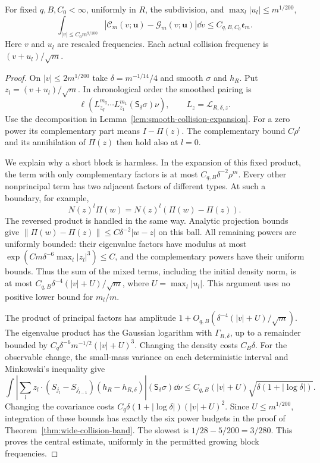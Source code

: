 \begin{theorem}
\label{thm:multiblock-collision-band}
For fixed $q,B,C_0<\infty$, uniformly in $R$, the subdivision, and
$\max_l|u_l|\le m^{1/200}$,
\begin{equation}\label{eq:multiblock-collision-band}
 \int_{|v|\le C_0m^{9/100}}
   |\mathcal C_m(v;\mathbf u)-\mathcal G_m(v;\mathbf u)|\dd v
          \le C_{q,B,C_0}\mathfrak e_m.
\end{equation}
Here $v$ and $u_l$ are rescaled frequencies. Each actual collision
frequency is $(v+u_l)/\sqrt m$.
\end{theorem}
\begin{proof}
On $|v|\le2m^{1/200}$ take $\delta=m^{-1/14}/4$ and smooth
$\sigma$ and $h_R$. Put $z_l=(v+u_l)/\sqrt m$. In chronological
order the smoothed pairing is
\[
 \ell\left(L_{z_q}^{m_q}\cdots L_{z_1}^{m_1}
                         (\mathsf S_\delta\sigma)\nu\right),
 \qquad L_z=\mathcal L_{R,\delta,z}.
\]
Use the decomposition in Lemma~\ref{lem:smooth-collision-expansion}.
For a zero power its complementary part means $I-\Pi(z)$.
The complementary bound $C\rho^l$ and its annihilation of $\Pi(z)$
then hold also at $l=0$.

We explain why a short block is harmless. In the expansion of this
fixed product, the term with only complementary factors is at most
$C_{q,B}\delta^{-2}\rho^m$. Every other nonprincipal term has two
adjacent factors of different types. At such a boundary, for example,
\[
 N(z)^{l}\Pi(w)=N(z)^{l}(\Pi(w)-\Pi(z)).
\]
The reversed product is handled in the same way. Analytic projection
bounds give $\|\Pi(w)-\Pi(z)\|\le C\delta^{-2}|w-z|$ on this
ball. All remaining powers are uniformly bounded: their eigenvalue
factors have modulus at most
$\exp(Cm\delta^{-6}\max_l|z_l|^3)\le C$, and the complementary
powers have their uniform bounds. Thus the sum of the mixed terms,
including the initial density norm, is at most
$C_{q,B}\delta^{-4}(|v|+U)/\sqrt m$, where $U=\max_l|u_l|$.
This argument uses no positive lower bound for $m_l/m$.

The product of principal factors has amplitude
$1+O_{q,B}(\delta^{-4}(|v|+U)/\sqrt m)$. The eigenvalue product
has the Gaussian logarithm with $\Gamma_{R,\delta}$, up to a remainder
bounded by $C_q\delta^{-6}m^{-1/2}(|v|+U)^3$.
Changing the density costs $C_B\delta$. For the observable change,
the small-mass variance on each deterministic interval and Minkowski's
inequality give
\[
 \int\left|\sum_l z_l\cdot
       (S_{j_l}-S_{j_{l-1}})(h_R-h_{R,\delta})\right|
                       (\mathsf S_\delta\sigma)\dd\nu
 \le C_{q,B}(|v|+U)\sqrt{\delta(1+|\log\delta|)}.
\]
Changing the covariance costs
$C_q\delta(1+|\log\delta|)(|v|+U)^2$. Since
$U\le m^{1/200}$, integration of these bounds has exactly the six
power budgets in the proof of Theorem~\ref{thm:wide-collision-band}.
The slowest is $1/28-5/200=3/280$. This proves the central estimate,
uniformly in the permitted growing block frequencies.


\end{proof}
